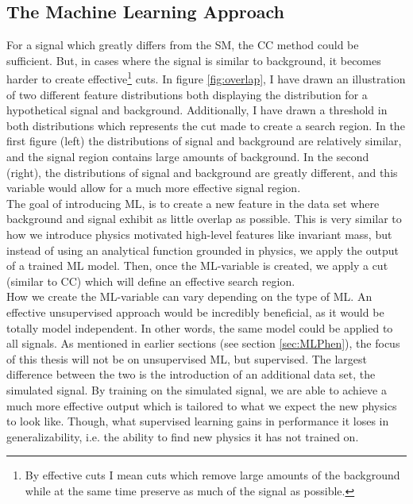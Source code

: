 \subsection{The Machine Learning Approach}
For a signal which greatly differs from the \ac{SM}, the \ac{CC} method could be sufficient. But, in 
cases where the signal is similar to background, it becomes harder to create effective\footnote{By effective
cuts I mean cuts which remove large amounts of the background while at the same time preserve as much of 
the signal as possible.} cuts. In figure \ref{fig:overlap}, I have drawn an illustration of two different feature distributions both 
displaying the distribution for a hypothetical signal and background. Additionally, I have drawn a 
threshold in both distributions which represents the cut made to create a search region. In the first 
figure (left) the distributions of signal and background are relatively similar, and the signal region 
contains large amounts of background. In the second (right), the distributions of signal and background 
are greatly different, and this variable would allow for a much more effective signal region. 
\\
The goal of introducing \ac{ML}, is to create a new feature in the data set where background and signal
exhibit as little overlap as possible. This is very similar to how we introduce physics motivated high-level
features like invariant mass, but instead of using an analytical function grounded in physics, 
we apply the output of a trained \ac{ML} model. Then, once the \ac{ML}-variable is created, 
we apply a cut (similar to \ac{CC}) which will define an effective search region. 
\\
How we create the \ac{ML}-variable can vary depending on the type of \ac{ML}. An effective unsupervised approach
would be incredibly beneficial, as it would be totally model independent. In other words, the same model could be applied 
to all signals. As mentioned in earlier sections (see section \ref{sec:MLPhen}), the focus of this thesis will not be on 
unsupervised \ac{ML}, but supervised. The largest difference between the two is the introduction of an additional data set,
the simulated signal. By training on the simulated signal, we are able to achieve a much more 
effective output which is tailored to what we expect the new physics to look like. Though, what supervised learning gains in performance
it loses in generalizability, i.e. the ability to find new physics it has not trained on.